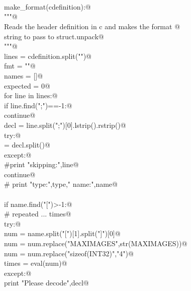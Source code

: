 \documentclass[10pt,a4paper,twoside,notitlepage]{article}
\begin{document}
\begin{flushleft}
\begin{list}{}{}
\mbox{}\verb@@\\
\mbox{}\verb@@\\
\mbox{}\verb@@\\
\mbox{}\verb@def make_format(cdefinition):@\\
\mbox{}\verb@    """@\\
\mbox{}\verb@    Reads the header definition in c and makes the format @\\
\mbox{}\verb@    string to pass to struct.unpack@\\
\mbox{}\verb@    """@\\
\mbox{}\verb@    lines = cdefinition.split("\n")@\\
\mbox{}\verb@    fmt = ""@\\
\mbox{}\verb@    names = []@\\
\mbox{}\verb@    expected = 0@\\
\mbox{}\verb@    for line in lines:@\\
\mbox{}\verb@        if line.find(";")==-1:@\\
\mbox{}\verb@            continue@\\
\mbox{}\verb@        decl  = line.split(";")[0].lstrip().rstrip()@\\
\mbox{}\verb@        try:@\\
\mbox{} = decl.split()@\\
\mbox{}\verb@        except:@\\
\mbox{}\verb@            #print "skipping:",line@\\
\mbox{}\verb@            continue@\\
\mbox{}\verb@        #        print "type:",type,"  name:",name@\\
\mbox{}\verb@@\\
\mbox{}\verb@        if name.find("[")>-1:@\\
\mbox{}\verb@            # repeated ... times@\\
\mbox{}\verb@            try:@\\
\mbox{}\verb@                num = name.split("[")[1].split("]")[0]@\\
\mbox{}\verb@                num = num.replace("MAXIMAGES",str(MAXIMAGES))@\\
\mbox{}\verb@                num = num.replace("sizeof(INT32)","4")@\\
\mbox{}\verb@                times = eval(num)@\\
\mbox{}\verb@            except:@\\
\mbox{}\verb@                print "Please decode",decl@\\

\end{list}
\end{flushleft}
\end{document}
